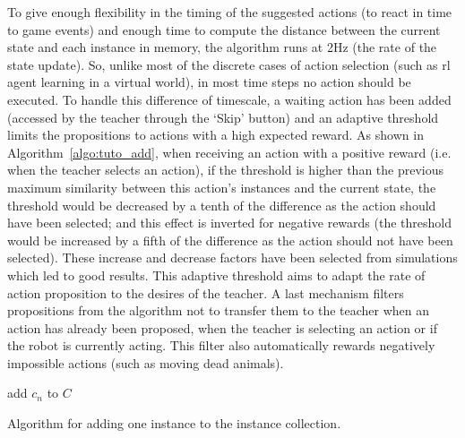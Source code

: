 To give enough flexibility in the timing of the suggested actions (to react in time to game events) and enough time to compute the distance between the current state and each instance in memory, the algorithm runs at 2Hz (the rate of the state update). So, unlike most of the discrete cases of action selection (such as \gls{rl} agent learning in a virtual world), in most time steps no action should be executed. To handle this difference of timescale, a waiting action has been added (accessed by the teacher through the `Skip' button) and an adaptive threshold limits the propositions to actions with a high expected reward. As shown in Algorithm~\ref{algo:tuto_add}, when receiving an action with a positive reward (i.e. when the teacher selects an action), if the threshold is higher than the previous maximum similarity between this action's instances and the current state, the threshold would be decreased by a tenth of the difference as the action should have been selected; and this effect is inverted for negative rewards (the threshold would be increased by a fifth of the difference as the action should not have been selected). These increase and decrease factors have been selected from simulations which led to good results. This adaptive threshold aims to adapt the rate of action proposition to the desires of the teacher. A last mechanism filters propositions from the algorithm not to transfer them to the teacher when an action has already been proposed, when the teacher is selecting an action or if the robot is currently acting. This filter also automatically rewards negatively impossible actions (such as moving dead animals).

\begin{algorithm}
	\DontPrintSemicolon
	add	$c_n$ to $C$
	\caption{Algorithm for adding one instance to the instance collection.}
	\label{algo:tuto_add}
\end{algorithm}

